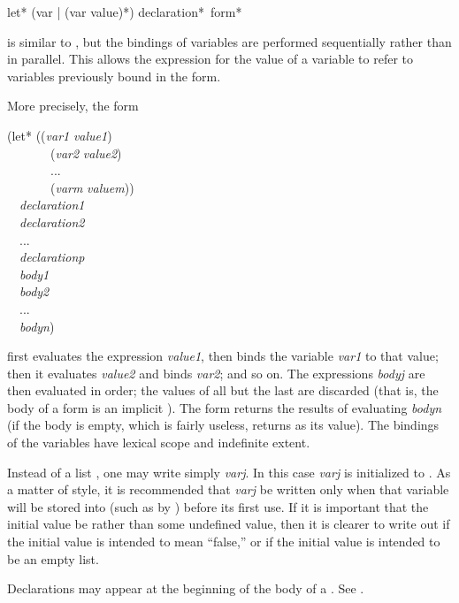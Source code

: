 \begin{defspec}
let* ({var | (var value)}*) {declaration}* {\,form}*

 is similar to , but the bindings of variables
are performed sequentially rather than in parallel.  This allows
the expression for the value of a variable to refer to variables
previously bound in the  form.

More precisely, the form
\begin{lisp}
(let* ((\textit{var1} \textit{value1}) \\
~~~~~~~(\textit{var2} \textit{value2}) \\
~~~~~~~... \\
~~~~~~~(\textit{varm} \textit{valuem})) \\
~~\textit{declaration1} \\
~~\textit{declaration2} \\
~~... \\
~~\textit{declarationp} \\
~~\textit{body1} \\
~~\textit{body2} \\
~~... \\
~~\textit{bodyn})
\end{lisp}
first evaluates the expression \textit{value1}, then binds the variable
\textit{var1} to that value; then it evaluates \textit{value2} and binds \textit{var2};
and so on.
The expressions \textit{bodyj} are then evaluated
in order; the values of all but the last are discarded
(that is, the body of a  form is an implicit ).
The  form returns the results of evaluating \textit{bodyn} (if the
body is empty, which is fairly useless,  returns {\false} as its value).
The bindings of the variables have lexical scope and indefinite extent.

Instead of a list , one may write simply \textit{varj}.
In this case \textit{varj} is initialized to {\false}.  As a matter of style,
it is recommended that \textit{varj} be written only when that variable
will be stored into (such as by ) before its first use.
If it is important that the initial value be {\nil} rather than
some undefined value, then it is clearer to write out
 if the initial value is intended to mean ``false,'' or
 if the initial value is intended to be an empty
list.

Declarations may appear at the beginning of the body of a .
See .


\end{defspec}
